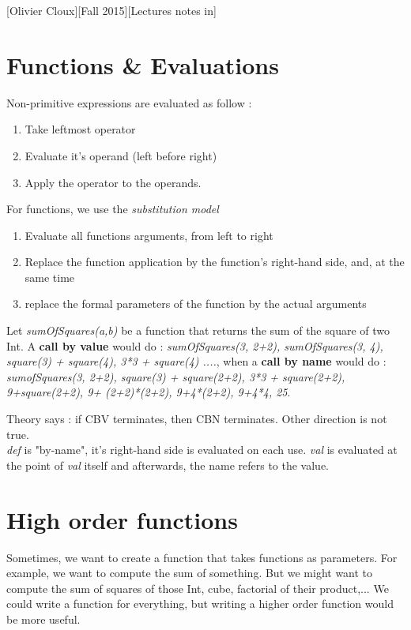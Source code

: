 \documentclass[12pt,a4paper]{article}
\date{Fall 2015}
\begin{document}
[Olivier Cloux][Fall 2015][Lectures notes in]	%
\tableofcontents
{}

\section{Functions \& Evaluations}
 Non-primitive expressions are evaluated as follow :
\begin{enumerate}
	\item  	Take leftmost operator
	\item 	Evaluate it's operand (left before right) 
	\item 	Apply the operator to the operands. 
\end{enumerate}
{For functions, we use the} \textit{substitution model}
\begin{enumerate}
	\item 	Evaluate all functions arguments, from left to right	
	\item 	Replace the function application by the function's right-hand side, and, at the same time
	\item 	replace the formal parameters of the function by the actual arguments
\end{enumerate} 
 Let \textit{sumOfSquares(a,b)} be a function that returns the sum of the square of two Int. A \textbf{call by value} would do : \textit{sumOfSquares(3, 2+2), sumOfSquares(3, 4), square(3) + square(4), 3*3 + square(4) ....}, when a \textbf{call by name} would do : \textit{sumofSquares(3, 2+2), square(3) + square(2+2), 3*3 + square(2+2), 9+square(2+2), 9+ (2+2)*(2+2), 9+4*(2+2), 9+4*4, 25}.

Theory says : if CBV terminates, then CBN terminates. Other direction is not true.\\
 \textit{def} is "by-name", it's right-hand side is evaluated on each use. \textit{val} is evaluated at the point of \textit{val} itself and afterwards, the name refers to the value.


\section{High order functions}
Sometimes, we want to create a function that takes functions as parameters. For example, we want to compute the sum of something. But we might want to compute the sum of squares of those Int, cube, factorial of their product,... We could write a function for everything, but writing a higher order function would be more useful.
\end{document}
